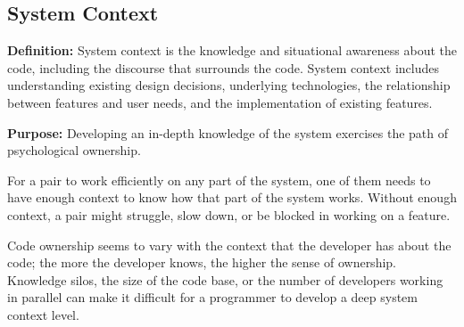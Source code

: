 

\subsection{System Context}
\textbf{Definition:} System context is the knowledge and situational awareness about the code, including the discourse that surrounds the code. System context includes understanding existing design decisions, underlying technologies, the relationship between features and user needs, and the implementation of existing features.

\textbf{Purpose:} Developing an in-depth knowledge of the system exercises the  path of psychological ownership.

For a pair to work efficiently on any part of the system, one of them needs to have enough context to know how that part of the system works. Without enough context, a pair might struggle, slow down, or be blocked in working on a feature.

Code ownership seems to vary with the context that the developer has about the code; the more the developer knows, the higher the sense of ownership. Knowledge silos, the size of the code base, or the number of developers working in parallel can make it difficult for a programmer to develop a deep system context level.

